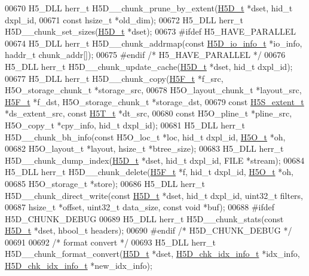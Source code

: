 \begin{DoxyCode}
00670 H5\_DLL herr\_t H5D\_\_chunk\_prune\_by\_extent(\hyperlink{struct_h5_d__t}{H5D\_t} *dset, hid\_t dxpl\_id,
00671     \textcolor{keyword}{const} hsize\_t *old\_dim);
00672 H5\_DLL herr\_t H5D\_\_chunk\_set\_sizes(\hyperlink{struct_h5_d__t}{H5D\_t} *dset);
00673 \textcolor{preprocessor}{#ifdef H5\_HAVE\_PARALLEL}
00674 H5\_DLL herr\_t H5D\_\_chunk\_addrmap(\textcolor{keyword}{const} \hyperlink{struct_h5_d__io__info__t}{H5D\_io\_info\_t} *io\_info, haddr\_t chunk\_addr[]);
00675 \textcolor{preprocessor}{#endif }\textcolor{comment}{/* H5\_HAVE\_PARALLEL */}\textcolor{preprocessor}{}
00676 H5\_DLL herr\_t H5D\_\_chunk\_update\_cache(\hyperlink{struct_h5_d__t}{H5D\_t} *dset, hid\_t dxpl\_id);
00677 H5\_DLL herr\_t H5D\_\_chunk\_copy(\hyperlink{struct_h5_f__t}{H5F\_t} *f\_src, H5O\_storage\_chunk\_t *storage\_src,
00678     H5O\_layout\_chunk\_t *layout\_src, \hyperlink{struct_h5_f__t}{H5F\_t} *f\_dst, H5O\_storage\_chunk\_t *storage\_dst,
00679     \textcolor{keyword}{const} \hyperlink{struct_h5_s__extent__t}{H5S\_extent\_t} *ds\_extent\_src, \textcolor{keyword}{const} \hyperlink{struct_h5_t__t}{H5T\_t} *dt\_src,
00680     \textcolor{keyword}{const} H5O\_pline\_t *pline\_src, H5O\_copy\_t *cpy\_info, hid\_t dxpl\_id);
00681 H5\_DLL herr\_t H5D\_\_chunk\_bh\_info(\textcolor{keyword}{const} H5O\_loc\_t *loc, hid\_t dxpl\_id, \hyperlink{struct_h5_o__t}{H5O\_t} *oh,
00682     H5O\_layout\_t *layout, hsize\_t *btree\_size);
00683 H5\_DLL herr\_t H5D\_\_chunk\_dump\_index(\hyperlink{struct_h5_d__t}{H5D\_t} *dset, hid\_t dxpl\_id, FILE *stream);
00684 H5\_DLL herr\_t H5D\_\_chunk\_delete(\hyperlink{struct_h5_f__t}{H5F\_t} *f, hid\_t dxpl\_id, \hyperlink{struct_h5_o__t}{H5O\_t} *oh,
00685     H5O\_storage\_t *store);
00686 H5\_DLL herr\_t H5D\_\_chunk\_direct\_write(\textcolor{keyword}{const} \hyperlink{struct_h5_d__t}{H5D\_t} *dset, hid\_t dxpl\_id, uint32\_t filters, 
00687          hsize\_t *offset, uint32\_t data\_size, \textcolor{keyword}{const} \textcolor{keywordtype}{void} *buf);
00688 \textcolor{preprocessor}{#ifdef H5D\_CHUNK\_DEBUG}
00689 H5\_DLL herr\_t H5D\_\_chunk\_stats(\textcolor{keyword}{const} \hyperlink{struct_h5_d__t}{H5D\_t} *dset, hbool\_t headers);
00690 \textcolor{preprocessor}{#endif }\textcolor{comment}{/* H5D\_CHUNK\_DEBUG */}\textcolor{preprocessor}{}
00691 
00692 \textcolor{comment}{/* format convert */}
00693 H5\_DLL herr\_t H5D\_\_chunk\_format\_convert(\hyperlink{struct_h5_d__t}{H5D\_t} *dset, \hyperlink{struct_h5_d__chk__idx__info__t}{H5D\_chk\_idx\_info\_t} *idx\_info, 
      \hyperlink{struct_h5_d__chk__idx__info__t}{H5D\_chk\_idx\_info\_t} *new\_idx\_info);

\end{DoxyCode}
